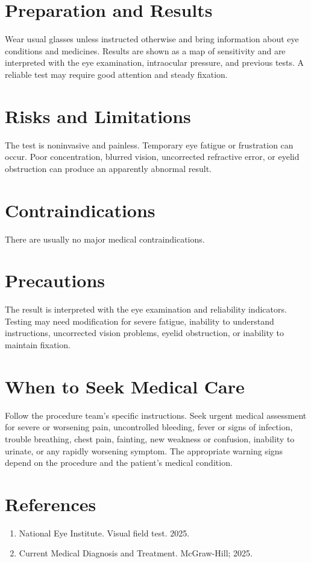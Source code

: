 \section*{Preparation and Results}
Wear usual glasses unless instructed otherwise and bring information about eye conditions and medicines. Results are shown as a map of sensitivity and are interpreted with the eye examination, intraocular pressure, and previous tests. A reliable test may require good attention and steady fixation.

\section*{Risks and Limitations}
The test is noninvasive and painless. Temporary eye fatigue or frustration can occur. Poor concentration, blurred vision, uncorrected refractive error, or eyelid obstruction can produce an apparently abnormal result.

\section*{Contraindications}
There are usually no major medical contraindications.

\section*{Precautions}
The result is interpreted with the eye examination and reliability indicators. Testing may need modification for severe fatigue, inability to understand instructions, uncorrected vision problems, eyelid obstruction, or inability to maintain fixation.

\section*{When to Seek Medical Care}
Follow the procedure team's specific instructions. Seek urgent medical assessment for severe or worsening pain, uncontrolled bleeding, fever or signs of infection, trouble breathing, chest pain, fainting, new weakness or confusion, inability to urinate, or any rapidly worsening symptom. The appropriate warning signs depend on the procedure and the patient's medical condition.

\section*{References}
\begin{enumerate}
  \item National Eye Institute. Visual field test. 2025.
  \item Current Medical Diagnosis and Treatment. McGraw-Hill; 2025.
\end{enumerate}
\clearpage
